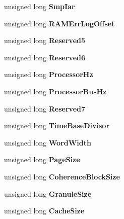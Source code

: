 \begin{DoxyCompactItemize}
unsigned long {\bfseries Smp\+Iar}
\item 
\mbox{\label{struct__VPD_aeb1ba9c13777b7b3143944fca0632619}} 
unsigned long {\bfseries R\+A\+M\+Err\+Log\+Offset}
\item 
\mbox{\label{struct__VPD_a7b4c5a531138b7f9bff09016a4dbd917}} 
unsigned long {\bfseries Reserved5}
\item 
\mbox{\label{struct__VPD_a10063af02cc9abdcb87b87407b3ab10e}} 
unsigned long {\bfseries Reserved6}
\item 
\mbox{\label{struct__VPD_a38015e729c121bf54a8d72915157625d}} 
unsigned long {\bfseries Processor\+Hz}
\item 
\mbox{\label{struct__VPD_a0edacfa6d89e4e8d2e4b7d23a9b32ba6}} 
unsigned long {\bfseries Processor\+Bus\+Hz}
\item 
\mbox{\label{struct__VPD_a5d0fb47470e84d0f2e4f10de9d37e213}} 
unsigned long {\bfseries Reserved7}
\item 
\mbox{\label{struct__VPD_a017c275892d6d403b11740b01301d8d6}} 
unsigned long {\bfseries Time\+Base\+Divisor}
\item 
\mbox{\label{struct__VPD_a591c6886cb3a1c050aab879ca301ef8c}} 
unsigned long {\bfseries Word\+Width}
\item 
\mbox{\label{struct__VPD_ae76f242bae954d14006719a38376073d}} 
unsigned long {\bfseries Page\+Size}
\item 
\mbox{\label{struct__VPD_a8a75c71e910ca25a5c53341134689f40}} 
unsigned long {\bfseries Coherence\+Block\+Size}
\item 
\mbox{\label{struct__VPD_ace99184885a7b6e854606c7422e98d42}} 
unsigned long {\bfseries Granule\+Size}
\item 
\mbox{\label{struct__VPD_abb7a21576ee75adf39294d464e8d34d2}} 
unsigned long {\bfseries Cache\+Size}
\item 
\mbox{\label{struct__VPD_a700de59b4dc60a8dec19b38df459b91d}} 

\end{DoxyCompactItemize}
